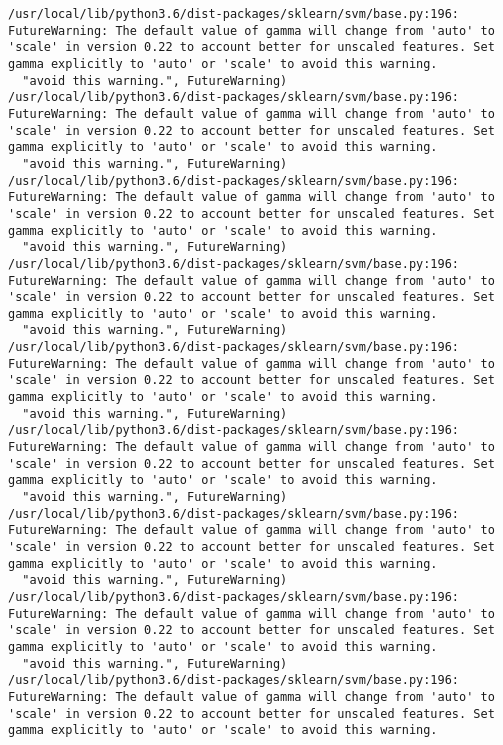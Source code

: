 \documentclass[11pt]{article}
\begin{document}
    \begin{Verbatim}[commandchars=\\\{\}]
/usr/local/lib/python3.6/dist-packages/sklearn/svm/base.py:196: FutureWarning: The default value of gamma will change from 'auto' to 'scale' in version 0.22 to account better for unscaled features. Set gamma explicitly to 'auto' or 'scale' to avoid this warning.
  "avoid this warning.", FutureWarning)
/usr/local/lib/python3.6/dist-packages/sklearn/svm/base.py:196: FutureWarning: The default value of gamma will change from 'auto' to 'scale' in version 0.22 to account better for unscaled features. Set gamma explicitly to 'auto' or 'scale' to avoid this warning.
  "avoid this warning.", FutureWarning)
/usr/local/lib/python3.6/dist-packages/sklearn/svm/base.py:196: FutureWarning: The default value of gamma will change from 'auto' to 'scale' in version 0.22 to account better for unscaled features. Set gamma explicitly to 'auto' or 'scale' to avoid this warning.
  "avoid this warning.", FutureWarning)
/usr/local/lib/python3.6/dist-packages/sklearn/svm/base.py:196: FutureWarning: The default value of gamma will change from 'auto' to 'scale' in version 0.22 to account better for unscaled features. Set gamma explicitly to 'auto' or 'scale' to avoid this warning.
  "avoid this warning.", FutureWarning)
/usr/local/lib/python3.6/dist-packages/sklearn/svm/base.py:196: FutureWarning: The default value of gamma will change from 'auto' to 'scale' in version 0.22 to account better for unscaled features. Set gamma explicitly to 'auto' or 'scale' to avoid this warning.
  "avoid this warning.", FutureWarning)
/usr/local/lib/python3.6/dist-packages/sklearn/svm/base.py:196: FutureWarning: The default value of gamma will change from 'auto' to 'scale' in version 0.22 to account better for unscaled features. Set gamma explicitly to 'auto' or 'scale' to avoid this warning.
  "avoid this warning.", FutureWarning)
/usr/local/lib/python3.6/dist-packages/sklearn/svm/base.py:196: FutureWarning: The default value of gamma will change from 'auto' to 'scale' in version 0.22 to account better for unscaled features. Set gamma explicitly to 'auto' or 'scale' to avoid this warning.
  "avoid this warning.", FutureWarning)
/usr/local/lib/python3.6/dist-packages/sklearn/svm/base.py:196: FutureWarning: The default value of gamma will change from 'auto' to 'scale' in version 0.22 to account better for unscaled features. Set gamma explicitly to 'auto' or 'scale' to avoid this warning.
  "avoid this warning.", FutureWarning)
/usr/local/lib/python3.6/dist-packages/sklearn/svm/base.py:196: FutureWarning: The default value of gamma will change from 'auto' to 'scale' in version 0.22 to account better for unscaled features. Set gamma explicitly to 'auto' or 'scale' to avoid this warning.

\end{Verbatim}
\end{document}

